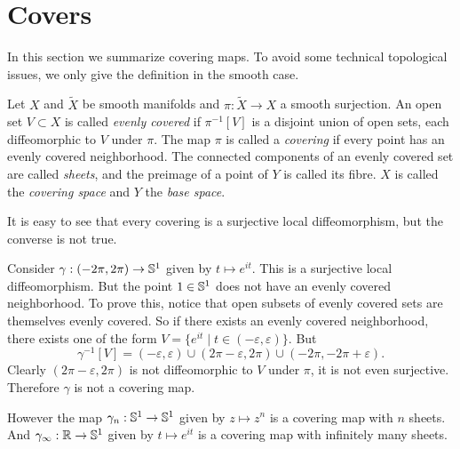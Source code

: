 

\section{Covers}

In this section we summarize covering maps.
To avoid some technical topological issues, we only give the definition in the smooth case.
\begin{definition}
\label{def:covering map}
\textup{\cite[p.~56]{Hatcher}}
Let $X$ and $\tilde{X}$ be smooth manifolds and $\pi : \tilde{X} \to X$ a smooth surjection.
An open set $V \subset X$ is called \emph{evenly covered} if $\pi^{-1}[V]$ is a disjoint union of open sets, each diffeomorphic to $V$ under $\pi$.
The map $\pi$ is called a \emph{covering} if every point has an evenly covered neighborhood.
The connected components of an evenly covered set are called \emph{sheets}, and the preimage of a point of $Y$ is called its fibre.
$X$ is called the \emph{covering space} and $Y$ the \emph{base space}.
\end{definition}

It is easy to see that every covering is a surjective local diffeomorphism, but the converse is not true.

\begin{example}
Consider $\gamma : (-2\pi, 2\pi) \to \mathbb{S}^1$ given by $t \mapsto e^{it}$.
This is a surjective local diffeomorphism.
But the point $1 \in \mathbb{S}^1$ does not have an evenly covered neighborhood.
To prove this, notice that open subsets of evenly covered sets are themselves evenly covered.
So if there exists an evenly covered neighborhood, there exists one of the form $V = \{ e^{it} \mid t \in (-\varepsilon,\varepsilon) \}$.
But 
\[
\gamma^{-1}[V] = (-\varepsilon,\varepsilon) \cup (2\pi - \varepsilon,2\pi) \cup (-2\pi,-2\pi+\varepsilon).
\]
Clearly $(2\pi - \varepsilon,2\pi)$ is not diffeomorphic to $V$ under $\pi$, it is not even surjective.
Therefore $\gamma$ is not a covering map.

However the map $\gamma_n : \mathbb{S}^1 \to \mathbb{S}^1$ given by $z \mapsto z^n$ is a covering map with $n$ sheets.
And $\gamma_\infty : \mathbb{R} \to \mathbb{S}^1$ given by $t \mapsto e^{it}$ is a covering map with infinitely many sheets.
\end{example}

